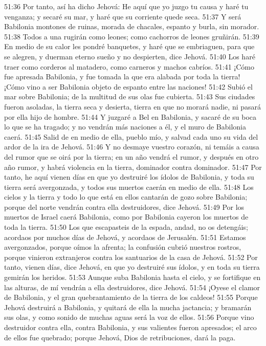 51:36 Por tanto, así ha dicho Jehová: He aquí que yo juzgo tu causa y haré tu venganza; y secaré su mar, y haré que su corriente quede seca.  
51:37 Y será Babilonia montones de ruinas, morada de chacales, espanto y burla, sin morador.  
51:38 Todos a una rugirán como leones; como cachorros de leones gruñirán.  
51:39 En medio de su calor les pondré banquetes, y haré que se embriaguen, para que se alegren, y duerman eterno sueño y no despierten, dice Jehová.  
51:40 Los haré traer como corderos al matadero, como carneros y machos cabríos.  
51:41 ¡Cómo fue apresada Babilonia, y fue tomada la que era alabada por toda la tierra! ¡Cómo vino a ser Babilonia objeto de espanto entre las naciones!  
51:42 Subió el mar sobre Babilonia; de la multitud de sus olas fue cubierta.  
51:43 Sus ciudades fueron asoladas, la tierra seca y desierta, tierra en que no morará nadie, ni pasará por ella hijo de hombre.  
51:44 Y juzgaré a Bel en Babilonia, y sacaré de su boca lo que se ha tragado; y no vendrán más naciones a él, y el muro de Babilonia caerá.  
51:45 Salid de en medio de ella, pueblo mío, y salvad cada uno su vida del ardor de la ira de Jehová.  
51:46 Y no desmaye vuestro corazón, ni temáis a causa del rumor que se oirá por la tierra; en un año vendrá el rumor, y después en otro año rumor, y habrá violencia en la tierra, dominador contra dominador.  
51:47 Por tanto, he aquí vienen días en que yo destruiré los ídolos de Babilonia, y toda su tierra será avergonzada, y todos sus muertos caerán en medio de ella.  
51:48 Los cielos y la tierra y todo lo que está en ellos cantarán de gozo sobre Babilonia;  porque del norte vendrán contra ella destruidores, dice Jehová.  
51:49 Por los muertos de Israel caerá Babilonia, como por Babilonia cayeron los muertos de toda la tierra.  
51:50 Los que escapasteis de la espada, andad, no os detengáis; acordaos por muchos días de Jehová, y acordaos de Jerusalén.  
51:51 Estamos avergonzados, porque oímos la afrenta; la confusión cubrió nuestros rostros, porque vinieron extranjeros contra los santuarios de la casa de Jehová.  
51:52 Por tanto, vienen días, dice Jehová, en que yo destruiré sus ídolos, y en toda su tierra gemirán los heridos.  
51:53 Aunque suba Babilonia hasta el cielo, y se fortifique en las alturas, de mí vendrán a ella destruidores, dice Jehová.  
51:54 ¡Oyese el clamor de Babilonia, y el gran quebrantamiento de la tierra de los caldeos!  
51:55 Porque Jehová destruirá a Babilonia, y quitará de ella la mucha jactancia; y bramarán sus olas, y como sonido de muchas aguas será la voz de ellos.  
51:56 Porque vino destruidor contra ella, contra Babilonia, y sus valientes fueron apresados; el arco de ellos fue quebrado; porque Jehová, Dios de retribuciones, dará la paga.  
